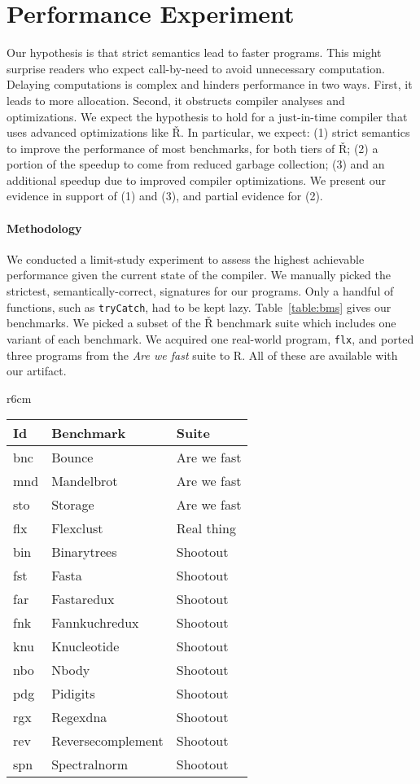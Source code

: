 \documentclass[review,screen,acmsmall]{acmart}
\renewcommand{\c}[1]{\lstinline |#1|\xspace}
\renewcommand{\Rsh}{{\sf\v R}\xspace}
\begin{document}
\section{Performance Experiment}\label{sec:rsh}

Our hypothesis is that strict semantics lead to faster programs. This might
surprise readers who expect call-by-need to avoid unnecessary computation.
Delaying computations is complex and hinders performance in two ways. First, it
leads to more allocation. Second, it obstructs compiler analyses and
optimizations. We expect the hypothesis to hold for a just-in-time compiler that
uses advanced optimizations like \Rsh. In particular, we expect: (1) strict
semantics to improve the performance of most benchmarks, for both tiers of \Rsh; (2)
a portion of the speedup to come from reduced garbage collection; (3) and an
additional speedup due to improved compiler optimizations. We present our
evidence in support of (1) and (3), and partial evidence for (2).

\paragraph{Methodology}
We conducted a limit-study experiment to assess the highest achievable
performance given the current state of the compiler. We manually picked the
strictest, semantically-correct, signatures for our programs. Only a handful of
functions, such as \lstinline{tryCatch}, had to be kept lazy.
Table~\ref{table:bms} gives our benchmarks. We picked a subset of the \Rsh
benchmark suite which includes one variant of each benchmark. We acquired one
real-world program, \c{flx}, and ported three programs from the \emph{Are we
fast} suite to R. All of these are available with our artifact.

\begin{wrapfigure}{r}{6cm}
  \small
  \caption{Benchmarks}\label{table:bms}
  \begin{tabular}{lll}
    \toprule
    \bf Id&\bf Benchmark&\bf Suite\\
    \midrule
    bnc&Bounce&Are we fast\\
    mnd&Mandelbrot&Are we fast\\
    sto&Storage&Are we fast\\
    flx&Flexclust&Real thing\\
    bin&Binarytrees&Shootout\\
    fst&Fasta&Shootout\\
    far&Fastaredux&Shootout\\
    fnk&Fannkuchredux&Shootout\\
    knu&Knucleotide&Shootout\\
    nbo&Nbody&Shootout\\
    pdg&Pidigits&Shootout\\
    rgx&Regexdna&Shootout\\
    rev&Reversecomplement&Shootout\\
    spn&Spectralnorm&Shootout\\
    \bottomrule
  \end{tabular}
\end{wrapfigure}
\end{document}
